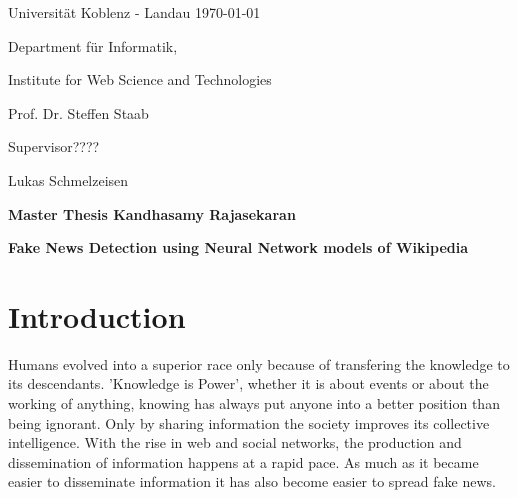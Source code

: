 \documentclass[a4paper, 11pt]{article}
\newcommand{\myName}{Kandhasamy Rajasekaran}
\newcommand{\Title}{Fake News Detection using Neural Network models of Wikipedia}
\newcommand{\subject}{Institute for Web Science and Technologies}
\newcommand{\expert}{Prof. Dr. Steffen Staab}%
\newcommand{\supervisor}{Supervisor????} %
\newcommand{\secondSupervisor}{Lukas Schmelzeisen} %
\newcommand{\type}{Master Thesis}
\begin{document}
Universit\"{a}t Koblenz - Landau \hfill \today

Department f\"{u}r Informatik,

\subject{}

\expert{}

\supervisor{}

\secondSupervisor{}

\begin{center}
	\large{\bf \type{}  \myName{}}

	\vspace*{0.5cm}

	\large{\bf \Title}
\end{center}

\setlength{\parskip}{1.5ex plus0.5ex minus 0.5ex}
\begin{abstract}
\frenchspacing
\noindent
The unprecedented growth of production and dissemination of information leads to an unprecedented growth of production and dissemination of Fake news. Fake news hinders the society from progressing by delaying the pursuit of right information. It is very essential to have a mechanism to detect and control fake news. Several organizations uses collaborative efforts of domain experts, a manual process which cannot withstand the proliferation of news production and dissemination. This research work will use Wikipedia as a ground reality and cross check claims automatically. Deep Neural Networks will be used to understand Wikipedia and the performance of different configurations of Neural Networks will be benchmarked against each other and the already available automated fake news detectors.
\end{abstract}
\section{Introduction}
\frenchspacing

Humans evolved into a superior race only because of transfering the knowledge to its descendants. 'Knowledge is Power', whether it is about events or about the working of anything, knowing has always put anyone into a better position than being ignorant. Only by sharing information the society improves its collective intelligence. With the rise in web and social networks, the production and dissemination of information happens at a rapid pace. As much as it became easier to disseminate information it has also become easier to spread fake news.
\end{document}
